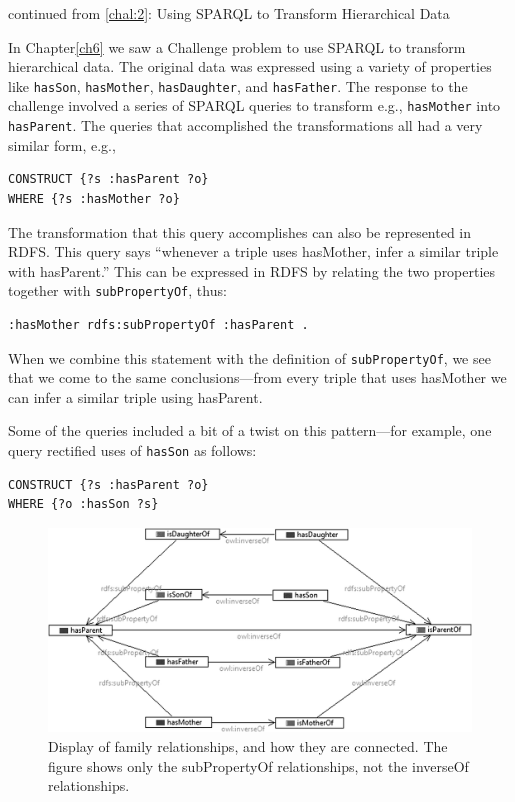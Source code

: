 \begin{challenge}{continued from \protect\ref{chal:2}: Using SPARQL to Transform Hierarchical Data}

In Chapter\ref{ch6} we saw a Challenge problem to use SPARQL to transform
hierarchical data. The original data was expressed using a variety of
properties like \texttt{hasSon}, \texttt{hasMother}, \texttt{hasDaughter}, and \texttt{hasFather}. The
response to the challenge involved a series of SPARQL queries to
transform e.g., \texttt{hasMother} into \texttt{hasParent}. The queries that accomplished
the transformations all had a very similar form, e.g.,

\begin{lstlisting}
CONSTRUCT {?s :hasParent ?o}
WHERE {?s :hasMother ?o}
\end{lstlisting}


The transformation that this query accomplishes can also be represented
in RDFS. This query says ``whenever a triple uses hasMother, infer a
similar triple with hasParent.'' This can be expressed in RDFS by
relating the two properties together with \texttt{subPropertyOf}, thus:

\begin{lstlisting}
:hasMother rdfs:subPropertyOf :hasParent .
\end{lstlisting}

When we combine this statement with the definition of \texttt{subPropertyOf}, we
see that we come to the same conclusions---from every triple that uses
hasMother we can infer a similar triple using hasParent.

Some of the queries included a bit of a twist on this pattern---for
example, one query rectified uses of
\texttt{hasSon} as follows:

\begin{lstlisting}
CONSTRUCT {?s :hasParent ?o}
WHERE {?o :hasSon ?s}
\end{lstlisting}



\begin{figure}
\centering
\includegraphics[width=5in]{media/ch9/f09-001.png}
\caption{Display of family relationships, and how they are connected. The figure shows only the
subPropertyOf relationships, not the inverseOf relationships.}
\label{fig:ch9.1}
\end{figure}





\end{challenge}
